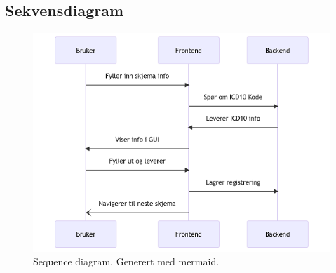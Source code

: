 \subsection{Sekvensdiagram}
\begin{figure}[ht]
\centering
\includegraphics{images/sequence-diagram.png}
\caption{Sequence diagram. Generert med mermaid.}
\label{fig:sequence-diagram}
\end{figure}